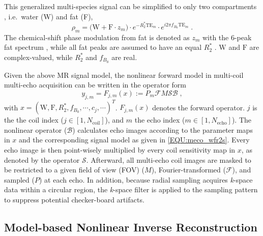 \documentclass[journal,twoside,web]{ieeecolor}
\begin{document}
This generalized multi-species signal can be simplified to only two compartments \cite{yu_2007_t2sideal,yu_2008_mft2sideal,chebrolu_2010_indiwf}, 
i.e.~water (W) and fat (F), 
\begin{equation} \label{EQU:meco_wfr2s}
\rho_m = \bigg( \text{W} + \text{F} \cdot z_m \bigg) \cdot e^{- R_2^* \text{TE}_m} \cdot e^{i2\pi f_{B_0} \text{TE}_m} \; .
\end{equation}
The chemical-shift phase modulation from fat is denoted as 
$z_m$ with the 6-peak fat spectrum \cite{yu_2008_mft2sideal}, 
while all fat peaks are assumed to have an equal $R_2^*$ \cite{reeder_2012_perfr2s}.
$\text{W}$ and $\text{F}$ are complex-valued, 
while $R_2^*$ and $f_{B_0}$ are real. 

Given the above MR signal model, the nonlinear forward model in multi-coil multi-echo acquisition 
can be written in the operator form 
\begin{equation} \label{EQU:op_fwd}
y_{j,m} = F_{j,m} (x) := P_m \mathcal{F} M \mathcal{S} \mathcal{B} \; ,
\end{equation}
with $x = (\text{W}, \text{F}, R_2^*, f_{B_0}, \cdots, c_j, \cdots)^T$. 
$F_{j,m} (x)$ denotes the forward operator.
$j$ is the the coil index ($j \in [1,N_\text{coil}]$), 
and $m$ the echo index ($m \in [1, N_\text{echo}]$). 
The nonlinear operator ($\mathcal{B}$) calculates echo images 
according to the parameter maps in $x$ and 
the corresponding signal model as given in \cref{EQU:meco_wfr2s}. 
Every echo image is then point-wisely multiplied by every coil sensitivity map in $x$, 
as denoted by the operator $\mathcal{S}$. 
Afterward, all multi-echo coil images are masked to be restricted to a given
field of view (FOV) ($M$), Fourier-transformed ($\mathcal{F}$), and sampled ($P$) at each echo.
In addition, because radial sampling acquires \textit{k}-space data within a circular region, 
the \textit{k}-space filter \cite{pruessmann_2001_gsense}
is applied to the sampling pattern to suppress potential checker-board artifacts.

\subsection{Model-based Nonlinear Inverse Reconstruction}
\end{document}
